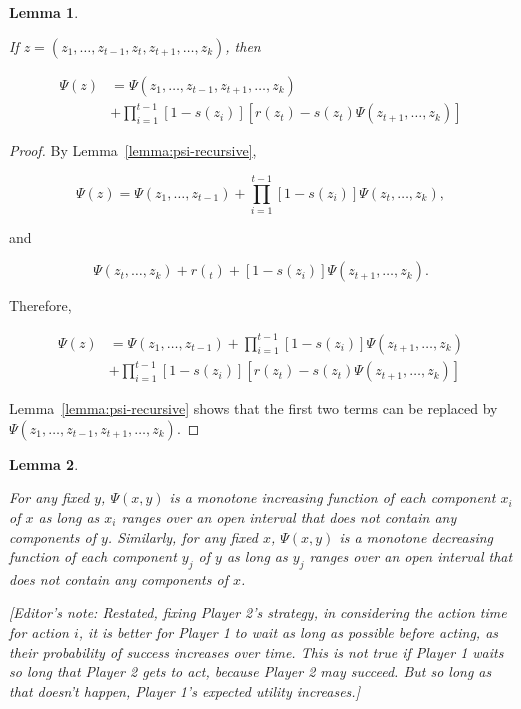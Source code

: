 \documentclass{article}
\newtheorem{lemma}{Lemma}
\theoremstyle{remark}
\begin{document}
\begin{lemma} \label{lemma:psi-remove-one}

If $z = (z_1, \dots, z_{t-1}, z_t, z_{t+1}, \dots, z_k)$, then

\[
\begin{aligned}
\Psi(z) &= \Psi(z_1, \dots, z_{t-1}, z_{t+1}, \dots, z_k)  \\
&+ \prod_{i=1}^{t-1} [1 - s(z_i)] [r(z_t) - s(z_t) \Psi(z_{t+1}, \dots, z_k)]
\end{aligned}
\]

\end{lemma}

\begin{proof}

By Lemma~\ref{lemma:psi-recursive},

\[
\Psi(z) = \Psi(z_1, \dots, z_{t-1}) +
\prod_{i=1}^{t-1} [1-s(z_i)] \Psi(z_t, \dots, z_k),
\]

and

\[
\Psi(z_t, \dots, z_k) +
r(_t) + [1-s(z_i)] \Psi(z_{t+1}, \dots, z_k).
\]

Therefore,

\[
\begin{aligned}
\Psi(z) &= \Psi(z_1, \dots, z_{t-1}) +
\prod_{i=1}^{t-1} [1 - s(z_i)] \Psi(z_{t+1}, \dots, z_k) \\
&+ \prod_{i=1}^{t-1} [1 - s(z_i)] [r(z_t) - s(z_t) \Psi(z_{t+1}, \dots, z_k)]
\end{aligned}
\]

Lemma~\ref{lemma:psi-recursive} shows that the first two terms can be replaced
by \\ $\Psi(z_1, \dots, z_{t-1}, z_{t+1}, \dots, z_k)$.

\end{proof}


\begin{lemma} \label{lemma:psi-monotone-increasing}

For any fixed $y$, $\Psi(x, y)$ is a monotone increasing function of each
component $x_i$ of $x$ as long as $x_i$ ranges over an open interval that does
not contain any components of $y$. Similarly, for any fixed $x$, $\Psi(x, y)$
is a monotone decreasing function of each component $y_j$ of $y$ as long as
$y_j$ ranges over an open interval that does not contain any components of $x$.

[\emph{Editor's note:} Restated, fixing Player 2's strategy, in considering the
action time for action $i$, it is better for Player 1 to wait as long as
possible before acting, as their probability of success increases over time.
This is not true if Player 1 waits so long that Player 2 gets to act, because
Player 2 may succeed. But so long as that doesn't happen, Player 1's expected
utility increases.]

\end{lemma}
\end{document}
